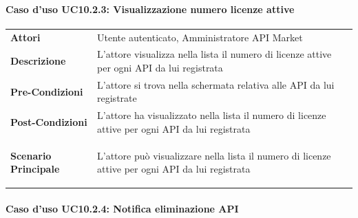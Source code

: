 \paragraph{Caso d'uso UC10.2.3: Visualizzazione numero licenze attive}
\label{UC10_2_3}

\begin{minipage}{\linewidth}
	\begin{tabular}{ l | p{11cm}}
		\hline
		\rowcolor{Gray}
		\multicolumn{2}{c}{UC10.2.3 - Visualizzazione numero licenze attive} \\
		\hline
		\textbf{Attori} & Utente autenticato, Amministratore API Market \\
		\textbf{Descrizione} & L'attore visualizza nella lista il numero di licenze attive per ogni API da lui registrata \\
		\textbf{Pre-Condizioni} & L'attore si trova nella schermata relativa alle API da lui registrate \\
		\textbf{Post-Condizioni} & L'attore ha visualizzato nella lista il numero di licenze attive per ogni API da lui registrata \\
		\textbf{Scenario Principale} & 
		\begin{enumerate*}[label=(\arabic*.),itemjoin={\newline}]
			\item L'attore può visualizzare nella lista il numero di licenze attive per ogni API da lui registrata
		\end{enumerate*}\\
	\end{tabular}
\end{minipage}

\paragraph{Caso d'uso UC10.2.4: Notifica eliminazione API}
\label{UC10_2_1}

